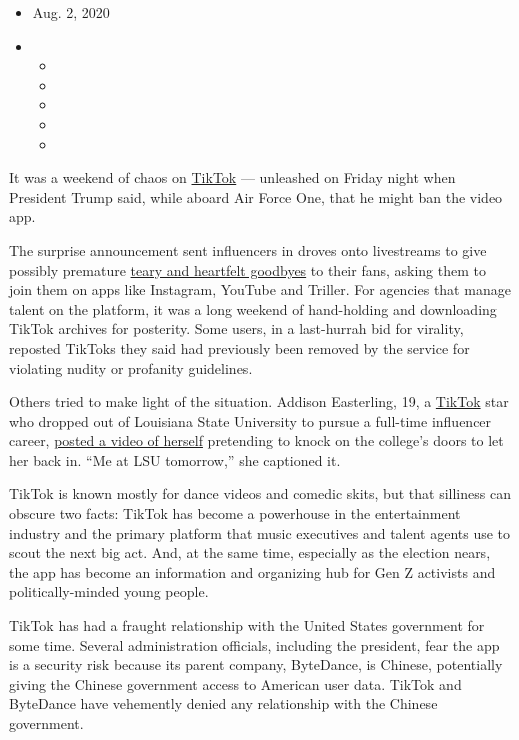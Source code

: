 \begin{itemize}
\item
  Aug. 2, 2020
\item
  \begin{itemize}
  \item
  \item
  \item
  \item
  \item
  \end{itemize}
\end{itemize}

It was a weekend of chaos on
\href{https://www.nytimes3xbfgragh.onion/2020/08/03/technology/trump-tiktok-microsoft.html}{TikTok}
--- unleashed on Friday night when President Trump said, while aboard
Air Force One, that he might ban the video app.

The surprise announcement sent influencers in droves onto livestreams to
give possibly premature
\href{https://twitter.com/iamaliceophelia/status/1289402462957273088}{teary
and heartfelt goodbyes} to their fans, asking them to join them on apps
like Instagram, YouTube and Triller. For agencies that manage talent on
the platform, it was a long weekend of hand-holding and downloading
TikTok archives for posterity. Some users, in a last-hurrah bid for
virality, reposted TikToks they said had previously been removed by the
service for violating nudity or profanity guidelines.

Others tried to make light of the situation. Addison Easterling, 19, a
\href{https://www.nytimes3xbfgragh.onion/2020/08/03/technology/trump-tiktok-microsoft.html}{TikTok}
star who dropped out of Louisiana State University to pursue a full-time
influencer career, \href{https://vm.tiktok.com/J2T9X8K/}{posted a video
of herself} pretending to knock on the college's doors to let her back
in. ``Me at LSU tomorrow,'' she captioned it.

TikTok is known mostly for dance videos and comedic skits, but that
silliness can obscure two facts: TikTok has become a powerhouse in the
entertainment industry and the primary platform that music executives
and talent agents use to scout the next big act. And, at the same time,
especially as the election nears, the app has become an information and
organizing hub for Gen Z activists and politically-minded young people.

TikTok has had a fraught relationship with the United States government
for some time. Several administration officials, including the
president, fear the app is a security risk because its parent company,
ByteDance, is Chinese, potentially giving the Chinese government access
to American user data. TikTok and ByteDance have vehemently denied any
relationship with the Chinese government.

